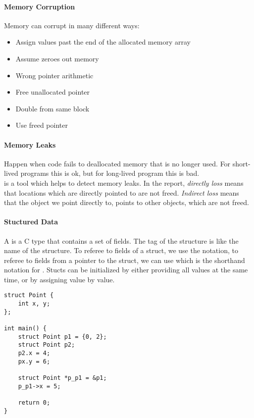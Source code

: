 \paragraph{Memory Corruption}
Memory can corrupt in many different ways:
\begin{itemize}
    \item Assign values past the end of the allocated memory array
    \item Assume  zeroes out memory
    \item Wrong pointer arithmetic
    \item Free unallocated pointer
    \item Double from same block
    \item Use freed pointer
\end{itemize}

\paragraph{Memory Leaks}
Happen when code fails to deallocated memory that is no longer used. For short-lived programs this is ok, but for long-lived program this is bad.\\
 is a tool which helps to detect memory leaks. In the report, \textit{directly loss} means that locations which are directly pointed to are not freed. \textit{Indirect loss} means that the object we point directly to, points to other objects, which are not freed.


\paragraph{Stuctured Data}
A  is a C type that contains a set of fields. The tag of the structure is like the name of the structure. To referee to fields of a struct, we use the  notation, to referee to fields from a pointer to the struct, we can use  which is the shorthand notation for . Stucts can be initialized by either providing all values at the same time, or by assigning value by value.

\begin{lstlisting}
struct Point {
    int x, y;
};

int main() {
    struct Point p1 = {0, 2};
    struct Point p2;
    p2.x = 4;
    px.y = 6;

    struct Point *p_p1 = &p1;
    p_p1->x = 5;

    return 0;
}
\end{lstlisting}

